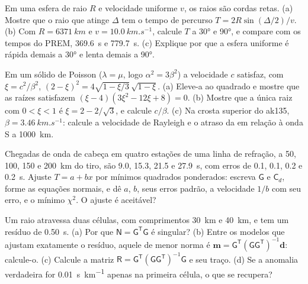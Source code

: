 \begin{exercise}[$\star\star$]\label{exo:b3:seismology-imaging:5}
Em uma esfera de raio $R$ e velocidade uniforme $v$, os raios são cordas retas.
(a) Mostre que o raio que atinge $\Delta$ tem o tempo de percurso
$T = 2R\sin(\Delta/2)/v$. (b) Com $R = \qty{6371}{km}$ e
$v = \qty{10.0}{km.s^{-1}}$, calcule $T$ a \ang{30} e \ang{90}, e compare
com os tempos do PREM, \qty{369.6}{s} e \qty{779.7}{s}. (c) Explique por que a
esfera uniforme é rápida demais a \ang{30} e lenta demais a \ang{90}.
\end{exercise}

\begin{exercise}[$\star\star$]\label{exo:b3:seismology-imaging:6}
Em um sólido de Poisson ($\lambda = \mu$, logo $\alpha^2 = 3\beta^2$) a 
velocidade $c$ satisfaz, com $\xi = c^2/\beta^2$,
$(2 - \xi)^2 = 4\sqrt{1 - \xi/3}\,\sqrt{1 - \xi}$. (a) Eleve-a ao quadrado e mostre
que as raízes satisfazem $(\xi - 4)(3\xi^2 - 12\xi + 8) = 0$. (b) Mostre que a
única raiz com $0 < \xi < 1$ é $\xi = 2 - 2/\sqrt3$, e calcule $c/\beta$.
(c) Na crosta superior do ak135, $\beta = \qty{3.46}{km.s^{-1}}$: calcule a
velocidade de Rayleigh e o atraso da  em relação à onda S a
\qty{1000}{km}.
\end{exercise}

\begin{exercise}[$\star\star$]\label{exo:b3:seismology-imaging:7}
Chegadas de onda de cabeça em quatro estações de uma linha de refração, a 50, 100, 150 e
\qty{200}{km} do tiro, são 9.0, 15.3, 21.5 e \qty{27.9}{s}, com
erros de 0.1, 0.1, 0.2 e \qty{0.2}{s}. Ajuste $T = a + bx$ por mínimos quadrados
ponderados: escreva $\mathsf G$ e $\mathsf C_d$, forme as equações normais, e
dê $a$, $b$, seus erros padrão, a velocidade $1/b$ com seu erro, e o
mínimo $\chi^2$. O ajuste é aceitável?
\end{exercise}

\begin{exercise}[$\star\star$]\label{exo:b3:seismology-imaging:8}
Um raio atravessa duas células, com comprimentos \qty{30}{km} e \qty{40}{km}, e tem
um resíduo de \qty{0.50}{s}. (a) Por que $\mathsf N = \mathsf G^{\mathsf T}
\mathsf G$ é singular? (b) Entre os modelos que ajustam exatamente o resíduo, aquele
de menor norma é $\mathbf m = \mathsf G^{\mathsf T}(\mathsf G\mathsf
G^{\mathsf T})^{-1}\mathbf d$: calcule-o. (c) Calcule a matriz
$\mathsf R = \mathsf G^{\mathsf T}(\mathsf G\mathsf G^{\mathsf T})^{-1}\mathsf G$
e seu traço. (d) Se a anomalia verdadeira for \qty{0.01}{s.km^{-1}} apenas na primeira
célula, o que se recupera?
\end{exercise}

